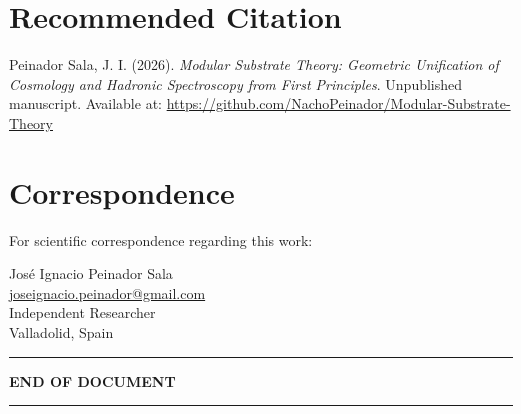 \documentclass[11pt, a4paper]{article}
\theoremstyle{plain}
\theoremstyle{definition}
\begin{document}
\section*{Recommended Citation}

Peinador Sala, J. I. (2026). \textit{Modular Substrate Theory: Geometric Unification of Cosmology and Hadronic Spectroscopy from First Principles}. Unpublished manuscript. Available at: \url{https://github.com/NachoPeinador/Modular-Substrate-Theory}

\section*{Correspondence}

For scientific correspondence regarding this work:
\begin{center}
José Ignacio Peinador Sala \\
\href{mailto:joseignacio.peinador@gmail.com}{joseignacio.peinador@gmail.com} \\
Independent Researcher \\
Valladolid, Spain
\end{center}

\vspace{1cm}

\begin{center}
\rule{0.8\textwidth}{0.5pt}

\textbf{END OF DOCUMENT}

\rule{0.8\textwidth}{0.5pt}
\end{center}
\end{document}
